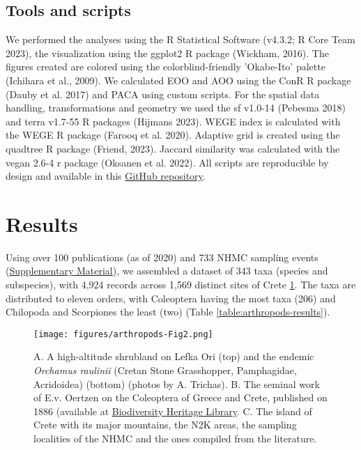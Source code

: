     \subsection{Tools and scripts}
    \label{subsec:arthropods-tools}
We performed the analyses using the R Statistical Software (v4.3.2; R Core Team 2023),
the visualization using the ggplot2 R package (Wickham, 2016). The figures
created are colored using the colorblind-friendly 'Okabe-Ito' palette (Ichihara et al., 2009).
We calculated EOO and AOO using the ConR R package (Dauby et al. 2017) and PACA
using custom scripts. For the spatial data handling, transformations and
geometry we used the sf v1.0-14 (Pebesma 2018) and terra v1.7-55 R packages (Hijmans 2023).
WEGE index is calculated with the WEGE R package (Farooq et al. 2020).
Adaptive grid is created using the quadtree R package (Friend, 2023).
Jaccard similarity was calculated with the vegan 2.6-4 r package (Oksanen et al. 2022).
All scripts are reproducible by design and available in this 
\href{https://github.com/savvas-paragkamian/arthropoda_assessment_crete}{GitHub repository}.

\section{Results}
\label{sec:arthropods-results}

Using over 100 publications (as of 2020) and 733 NHMC sampling events
(\href{https://doi.org/10.5281/zenodo.10635645}{Supplementary Material}), we assembled a dataset of 343 taxa (species and subspecies),
with 4,924 records across 1,569 distinct sites of Crete \ref{fig:arthropods-fig2}. The taxa
are distributed to eleven orders, with Coleoptera having the most taxa (206)
and Chilopoda and Scorpiones the least (two) (Table \ref{table:arthropods-results}).

   \begin{figure}[h]
      \centering
      \texttt{[image: figures/arthropods-Fig2.png]}
      \caption[The common endemicity hotspots of all orders]{A. A high-altitude shrubland on Lefka Ori (top) and the endemic \textit{Orchamus raulinii} (Cretan Stone Grasshopper, Pamphagidae, Acridoidea) (bottom) (photos by A. Trichas). B. The seminal work of E.v. Oertzen on the Coleoptera of Greece and Crete, published on 1886 (available at \href{https://www.biodiversitylibrary.org/page/32058852}{Biodiversity Heritage Library}. C. The island of Crete with its major mountains, the N2K areas, the sampling localities of the NHMC and the ones compiled from the literature.}
      \label{fig:arthropods-fig2}
   \end{figure}


